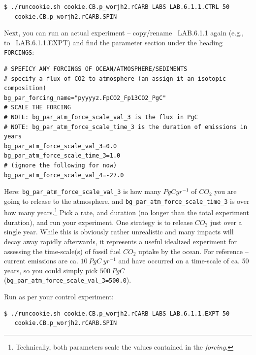 \vspace{-2mm}\small\begin{verbatim}
$ ./runcookie.sh cookie.CB.p_worjh2.rCARB LABS LAB.6.1.1.CTRL 50 
   cookie.CB.p_worjh2.rCARB.SPIN
\end{verbatim}\normalsize\vspace{-2mm}

\noindent Next, you can run an actual experiment -- copy/rename \textsf{\footnotesize\ LAB.6.1.1} again (e.g., to \textsf{\footnotesize\ LAB.6.1.1.EXPT}) and find the parameter section under the heading \texttt{\small FORCINGS}:

\vspace{-2mm}\footnotesize\begin{verbatim}
# SPEFICY ANY FORCINGS OF OCEAN/ATMOSPHERE/SEDIMENTS
# specify a flux of CO2 to atmosphere (an assign it an isotopic composition)
bg_par_forcing_name="pyyyyz.FpCO2_Fp13CO2_PgC"
# SCALE THE FORCING 
# NOTE: bg_par_atm_force_scale_val_3 is the flux in PgC
# NOTE: bg_par_atm_force_scale_time_3 is the duration of emissions in years
bg_par_atm_force_scale_val_3=0.0
bg_par_atm_force_scale_time_3=1.0
# (ignore the following for now)
bg_par_atm_force_scale_val_4=-27.0
\end{verbatim}\normalsize\vspace{-2mm}

Here: \texttt{\small bg\_par\_atm\_force\_scale\_val\_3} is how many $PgC yr^{-1}$ of $CO_2$ you are going to release to the atmosphere, and \texttt{\small bg\_par\_atm\_force\_scale\_time\_3} is over how many years.\footnote{Technically, both parameters scale the values contained in the \textit{forcing}.} Pick a rate, and duration (no longer than the total experiment duration), and run your experiment. One strategy is to release \(CO_{2}\) just over a single year. While this is obviously rather unrealistic and many impacts will decay away rapidly afterwards, it represents a useful idealized experiment for assessing the time-scale(s) of fossil fuel \(CO_{2}\) uptake by the ocean. For reference -- current emissions are ca. \(10\:PgC\:yr^{-1}\) and have occurred on a time-scale of ca. 50 years, so you could simply pick $500\:PgC$ (\texttt{\small bg\_par\_atm\_force\_scale\_val\_3=500.0}).

\vspace{1mm}
\noindent Run as per your control experiment:

\vspace{-2mm}\small\begin{verbatim}
$ ./runcookie.sh cookie.CB.p_worjh2.rCARB LABS LAB.6.1.1.EXPT 50 
   cookie.CB.p_worjh2.rCARB.SPIN
\end{verbatim}\normalsize\vspace{-2mm}

